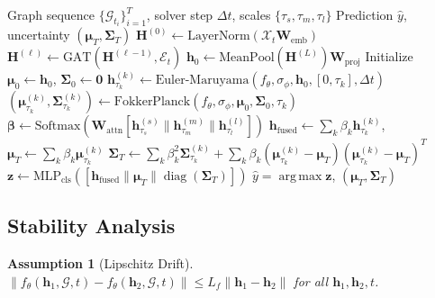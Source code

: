 \documentclass[10pt,journal,compsoc]{IEEEtran}
\newcommand{\G}{\mathcal{G}}
\newcommand{\X}{\mathcal{X}}
\DeclareMathOperator*{\argmax}{arg\,max}
\DeclareMathOperator{\diag}{diag}
\newtheorem{assumption}{Assumption}
\begin{document}
\begin{algorithm}[!t]
\caption{SDE-TGNN Forward Pass}
\label{alg:sde_tgnn_forward}
\begin{algorithmic}[1]
\REQUIRE Graph sequence $\{\G_{t_i}\}_{i=1}^T$, solver step $\Delta t$, scales $\{\tau_s, \tau_m, \tau_l\}$
\ENSURE Prediction $\hat{y}$, uncertainty $(\boldsymbol{\mu}_T, \boldsymbol{\Sigma}_T)$
\STATE $\mathbf{H}^{(0)} \leftarrow \text{LayerNorm}(\X_t \mathbf{W}_{\text{emb}})$
    \STATE $\mathbf{H}^{(\ell)} \leftarrow \text{GAT}(\mathbf{H}^{(\ell-1)}, \mathcal{E}_t)$
\ENDFOR
\STATE $\mathbf{h}_0 \leftarrow \text{MeanPool}(\mathbf{H}^{(L)}) \mathbf{W}_{\text{proj}}$
\STATE Initialize $\boldsymbol{\mu}_0 \leftarrow \mathbf{h}_0$, $\boldsymbol{\Sigma}_0 \leftarrow \mathbf{0}$
    \STATE $\mathbf{h}_{\tau_k}^{(k)} \leftarrow \text{Euler-Maruyama}(f_\theta, \sigma_\phi, \mathbf{h}_0, [0, \tau_k], \Delta t)$
    \STATE $(\boldsymbol{\mu}_{\tau_k}^{(k)}, \boldsymbol{\Sigma}_{\tau_k}^{(k)}) \leftarrow \text{FokkerPlanck}(f_\theta, \sigma_\phi, \boldsymbol{\mu}_0, \boldsymbol{\Sigma}_0, \tau_k)$
\ENDFOR
\STATE $\boldsymbol{\beta} \leftarrow \text{Softmax}(\mathbf{W}_{\text{attn}}[\mathbf{h}_{\tau_s}^{(s)} \| \mathbf{h}_{\tau_m}^{(m)} \| \mathbf{h}_{\tau_l}^{(l)}])$
\STATE $\mathbf{h}_{\text{fused}} \leftarrow \sum_k \beta_k \mathbf{h}_{\tau_k}^{(k)}$, \quad $\boldsymbol{\mu}_T \leftarrow \sum_k \beta_k \boldsymbol{\mu}_{\tau_k}^{(k)}$
\STATE $\boldsymbol{\Sigma}_T \leftarrow \sum_k \beta_k^2 \boldsymbol{\Sigma}_{\tau_k}^{(k)} + \sum_k \beta_k(\boldsymbol{\mu}_{\tau_k}^{(k)} - \boldsymbol{\mu}_T)(\boldsymbol{\mu}_{\tau_k}^{(k)} - \boldsymbol{\mu}_T)^T$
\STATE $\mathbf{z} \leftarrow \text{MLP}_{\text{cls}}([\mathbf{h}_{\text{fused}} \| \boldsymbol{\mu}_T \| \diag(\boldsymbol{\Sigma}_T)])$
\RETURN $\hat{y} = \argmax \mathbf{z}$, $(\boldsymbol{\mu}_T, \boldsymbol{\Sigma}_T)$
\end{algorithmic}
\end{algorithm}

\vspace{-0.2cm}
\subsection{Stability Analysis}

\begin{assumption}[Lipschitz Drift]
\label{ass:lipschitz}
$\|f_\theta(\mathbf{h}_1,\G,t)-f_\theta(\mathbf{h}_2,\G,t)\| \le L_f \|\mathbf{h}_1-\mathbf{h}_2\|$ for all $\mathbf{h}_1,\mathbf{h}_2,t$.
\end{assumption}
\end{document}
